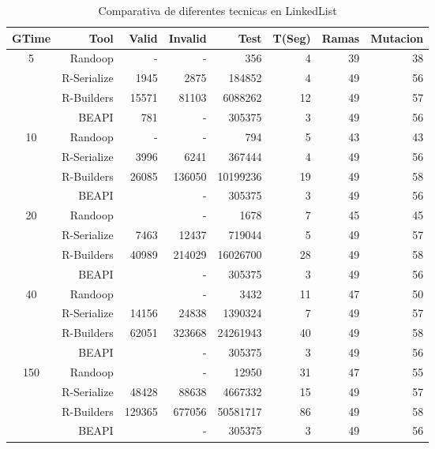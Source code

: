 \begin{table}[H]
\scriptsize
\centering
\label{tab:results-obj1}
\begin{tabular}{ c  r  |r | r | r|r|r|r  }
  \toprule
  \textbf{GTime} & \textbf{Tool} & \textbf{Valid}  & \textbf{Invalid} & \textbf{Test}&\textbf{T(Seg)} &\textbf{Ramas}  & \textbf{Mutacion} \\ 
  \midrule
5	&	Randoop	&	-	&	-	&	356	&	4	&	39	&	38	\\
	&	R-Serialize	&	1945	&	2875	&	184852	&	4	&	49	&	56	\\
	&	R-Builders	&	15571	&	81103	&	6088262	&	12	&	49	&	57	\\
	&	BEAPI	&	781	&	-	&	305375	&	3	&	49	&	56	\\
 \cline{2-8}															
10	&	Randoop	&	-	&	-	&	794	&	5	&	43	&	43	\\
	&	R-Serialize	&	3996	&	6241	&	367444	&	4	&	49	&	56	\\
	&	R-Builders	&	26085	&	136050	&	10199236	&	19	&	49	&	58	\\
	&	BEAPI	&		&	-	&	305375	&	3	&	49	&	56	\\
 \cline{2-8}															
20	&	Randoop	&		&	-	&	1678	&	7	&	45	&	45	\\
	&	R-Serialize	&	7463	&	12437	&	719044	&	5	&	49	&	57	\\
	&	R-Builders	&	40989	&	214029	&	16026700	&	28	&	49	&	58	\\
	&	BEAPI	&		&	-	&	305375	&	3	&	49	&	56	\\
 \cline{2-8}															
40	&	Randoop	&		&	-	&	3432	&	11	&	47	&	50	\\
	&	R-Serialize	&	14156	&	24838	&	1390324	&	7	&	49	&	57	\\
	&	R-Builders	&	62051	&	323668	&	24261943	&	40	&	49	&	58	\\
	&	BEAPI	&		&	-	&	305375	&	3	&	49	&	56	\\
 \cline{2-8}															
150	&	Randoop	&		&	-	&	12950	&	31	&	47	&	55	\\
	&	R-Serialize	&	48428	&	88638	&	4667332	&	15	&	49	&	57	\\
	&	R-Builders	&	129365	&	677056	&	50581717	&	86	&	49	&	58	\\
	&	BEAPI	&		&	-	&	305375	&	3	&	49	&	56	\\
\midrule
\end{tabular}
\label{tab:linkedListTools}
\caption{Comparativa de diferentes tecnicas en LinkedList}
\end{table}

